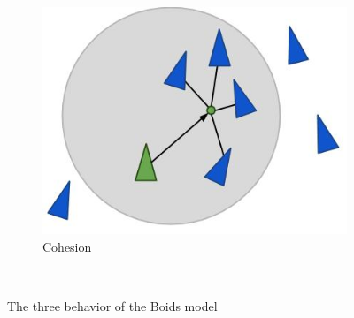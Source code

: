 \begin{figure}[h!]
        \begin{subfigure}[b]{0.3\textwidth}
                \includegraphics[width=\textwidth]{images/boid_cohesion.jpg}
                \caption{Cohesion}
                \label{fig:boidcoh}
        \end{subfigure}
        ~ %
        \caption{The three behavior of the Boids model}\label{fig:boidbehavior}
\end{figure} 

